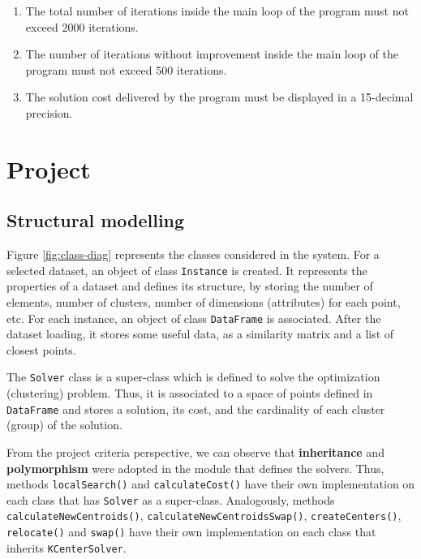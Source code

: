 \documentclass[10pt]{article}
\begin{document}
\begin{enumerate}
	\item The total number of iterations inside the main loop of the program must not exceed 2000 iterations.

	\item The number of iterations without improvement inside the main loop of the program must not exceed 500 iterations.

	\item The solution cost delivered by the program must be displayed in a 15-decimal precision.

\end{enumerate}

\section{Project}

\subsection{Structural modelling}
Figure \ref{fig:class-diag} represents the classes considered in the system. For a selected dataset, an object of class \verb+Instance+ is created. It represents the properties of a dataset and defines its structure, by storing the number of elements, number of clusters, number of dimensions (attributes) for each point, etc. For each instance, an object of class \verb+DataFrame+ is associated. After the dataset loading, it stores some useful data, as a similarity matrix and a list of closest points.

The \verb+Solver+ class is a super-class which is defined to solve the optimization (clustering) problem. Thus, it is associated to a space of points defined in \verb+DataFrame+ and stores a solution, its cost, and the cardinality of each cluster (group) of the solution.

From the project criteria perspective, we can observe that \textbf{inheritance} and \textbf{polymorphism} were adopted in the module that defines the solvers. Thus, methods \verb+localSearch()+ and \verb+calculateCost()+ have their own implementation on each class that has \verb+Solver+ as a super-class. Analogously, methods \verb+calculateNewCentroids()+, \verb+calculateNewCentroidsSwap()+, \verb+createCenters()+, \verb+relocate()+ and \verb+swap()+ have their own implementation on each class that inherits \verb+KCenterSolver+.
\end{document}

